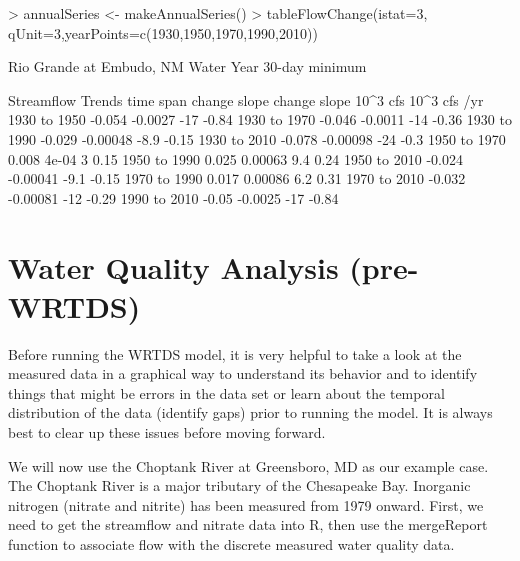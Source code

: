 \documentclass[a4paper,11pt]{article}
\begin{document}
\begin{Schunk}
\begin{Sinput}
> annualSeries <- makeAnnualSeries()
> tableFlowChange(istat=3, qUnit=3,yearPoints=c(1930,1950,1970,1990,2010))
\end{Sinput}
\begin{Soutput}
   Rio Grande at Embudo, NM
   Water Year
    30-day minimum 

             Streamflow Trends
   time span          change        slope       change        slope
                      10^3 cfs 10^3 cfs /yr         %
 1930  to  1950       -0.054      -0.0027          -17        -0.84
 1930  to  1970       -0.046      -0.0011          -14        -0.36
 1930  to  1990       -0.029     -0.00048         -8.9        -0.15
 1930  to  2010       -0.078     -0.00098          -24         -0.3
 1950  to  1970        0.008        4e-04            3         0.15
 1950  to  1990        0.025      0.00063          9.4         0.24
 1950  to  2010       -0.024     -0.00041         -9.1        -0.15
 1970  to  1990        0.017      0.00086          6.2         0.31
 1970  to  2010       -0.032     -0.00081          -12        -0.29
 1990  to  2010        -0.05      -0.0025          -17        -0.84
\end{Soutput}
\end{Schunk}


\FloatBarrier

\section{Water Quality Analysis (pre-WRTDS)}
\label{sec:wqa}
Before running the WRTDS model, it is very helpful to take a look at the measured data in a graphical way to understand its behavior and to identify things that might be errors in the data set or learn about the temporal distribution of the data (identify gaps) prior to running the model.  It is always best to clear up these issues before moving forward.

We will now use the Choptank River at Greensboro, MD as our example case. The Choptank River is a major tributary of the Chesapeake Bay. Inorganic nitrogen (nitrate and nitrite) has been measured from 1979 onward. First, we need to get the streamflow and nitrate data into R, then use the mergeReport function to associate flow with the discrete measured water quality data.
\end{document}
